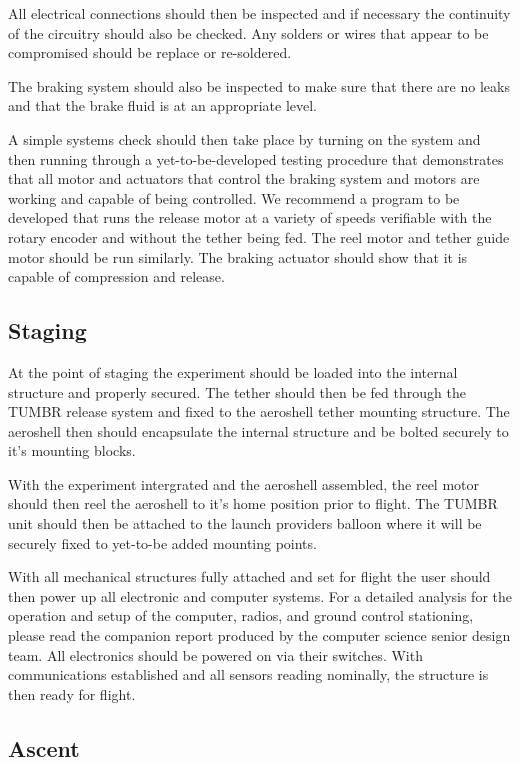 All electrical connections should then be inspected and if necessary the continuity of the circuitry should also be checked. Any solders or wires that appear to be compromised should be replace or re-soldered. 

The braking system should also be inspected to make sure that there are no leaks and that the brake fluid is at an appropriate level. 

A simple systems check should then take place by turning on the system and then running through a yet-to-be-developed testing procedure that demonstrates that all motor and actuators that control the braking system and motors are working and capable of being controlled. We recommend a program to be developed that runs the release motor at a variety of speeds verifiable with the rotary encoder and without the tether being fed. The reel motor and tether guide motor should be run similarly. The braking actuator should show that it is capable of compression and release. 

\subsection*{Staging}

\indent\indent At the point of staging the experiment should be loaded into the internal structure and properly secured. The tether should then be fed through the TUMBR release system and fixed to the aeroshell tether mounting structure. The aeroshell then should encapsulate the internal structure and be bolted securely to it's mounting blocks. 

With the experiment intergrated and the aeroshell assembled, the reel motor should then reel the aeroshell to it's home position prior to flight. The TUMBR unit should then be attached to the launch providers balloon where it will be securely fixed to yet-to-be added mounting points. 

With all mechanical structures fully attached and set for flight the user should then power up all electronic and computer systems. For a detailed analysis for the operation and setup of the computer, radios, and ground control stationing, please read the companion report produced by the computer science senior design team. All electronics should be powered on via their switches. With communications established and all sensors reading nominally, the structure is then ready for flight. 

\subsection*{Ascent}

